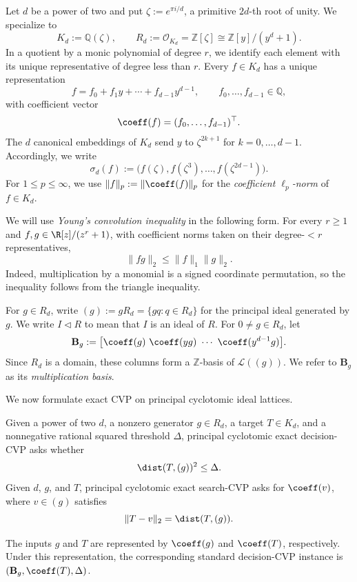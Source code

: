 Let $d$ be a power of two and put
$\zeta\mathrel{:=}e^{\pi i/d}$, a primitive
$2d$-th root of unity. We specialize to
\[
  K_d:=\mathbb{Q}(\zeta),
  \qquad
  R_d:=\mathcal{O}_{K_d}
       =\mathbb{Z}[\zeta]
       \cong\mathbb{Z}[y]/(y^d+1).
\]
In a quotient by a monic polynomial of degree \(r\), we identify
each element with its unique representative of degree less than \(r\).
Every $f\in K_d$ has a unique representation
\[
  f=f_0+f_1y+\cdots+f_{d-1}y^{d-1},
  \qquad f_0,\ldots,f_{d-1}\in\mathbb{Q},
\]
with coefficient vector
\[
  \coeff(f)
  =(f_0,\ldots,f_{d-1})^\top.
\]
The $d$ canonical embeddings of $K_d$ send $y$ to $\zeta^{2k+1}$ for
$k=0,\ldots,d-1$.
Accordingly, we write
\[
  \sigma_d(f)
  \mathrel{:=}\bigl(f(\zeta),f(\zeta^3),\ldots,f(\zeta^{2d-1})\bigr).
\]
For \(1\leq p\leq\infty\), we use
\(\|f\|_p:=\|\coeff(f)\|_p\) for the
\emph{coefficient \(\ell_p\)-norm} of
\(f\in K_d\).

We will use \emph{Young's convolution inequality} in the following form.
For every \(r\geq1\) and \(f,g\in\R[z]/(z^r+1)\), with coefficient norms
taken on their degree-\(<r\) representatives,
\[
 \|fg\|_2\leq\|f\|_1\|g\|_2.
\]
Indeed, multiplication by a monomial is a signed coordinate permutation, so
the inequality follows from the triangle inequality.

For \(g\in R_d\), write
\((g):=gR_d=\{gq:q\in R_d\}\) for the principal ideal generated by \(g\).
We write \(I\lhd R\) to mean that \(I\) is an ideal of \(R\).
For $0\neq g\in R_d$, let
\[
  \mathbf B_g
  :=\bigl[\coeff(g)\ \coeff(yg)\ \cdots\ \coeff(y^{d-1}g)\bigr].
\]
Since $R_d$ is a domain, these columns form a $\mathbb Z$-basis of
$\mathcal L((g))$. We refer to $\mathbf B_g$ as its
\emph{multiplication basis}.

We now formulate exact CVP on principal cyclotomic ideal lattices.
\begin{definition}
\label{def:principal-cyclotomic-cvp}
Given a power of two $d$, a nonzero generator $g\in R_d$, a target
$T\in K_d$, and a nonnegative rational squared threshold $\Delta$,
principal cyclotomic exact decision-CVP asks whether
\[
 {\dist(T,(g))^2\leq\Delta.}
\]
Given $d$, $g$, and $T$, principal cyclotomic exact search-CVP asks for
$\coeff(v)$, where $v\in(g)$ satisfies
\[
 {\|T-v\|_2=\dist(T,(g)).}
\]
\end{definition}

The inputs $g$ and $T$ are represented by $\coeff(g)$ and $\coeff(T)$,
respectively.  Under this representation, the corresponding standard
decision-CVP instance is $(\mathbf B_g,\coeff(T),\Delta)$.

